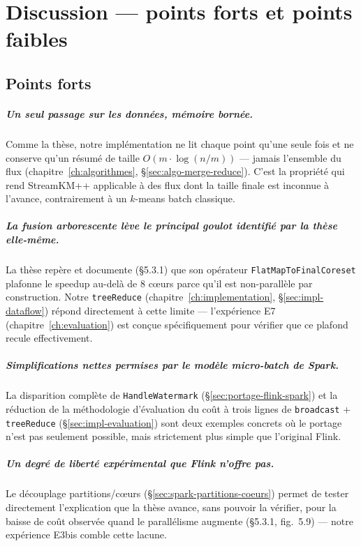 \chapter{Discussion --- points forts et points faibles}
\label{ch:discussion}

\section{Points forts}

\paragraph{Un seul passage sur les données, mémoire bornée.} Comme la thèse,
notre implémentation ne lit chaque point qu'une seule fois et ne conserve
qu'un résumé de taille $O(m \cdot \log(n/m))$ --- jamais l'ensemble du flux
(chapitre~\ref{ch:algorithmes}, §\ref{sec:algo-merge-reduce}). C'est la
propriété qui rend StreamKM++ applicable à des flux dont la taille finale
est inconnue à l'avance, contrairement à un $k$-means batch classique.

\paragraph{La fusion arborescente lève le principal goulot identifié par la
thèse elle-même.} La thèse repère et documente (§5.3.1) que son opérateur
\texttt{FlatMapToFinalCoreset} plafonne le speedup au-delà de 8 c\oe{}urs parce
qu'il est non-parallèle par construction. Notre \texttt{treeReduce}
(chapitre~\ref{ch:implementation}, §\ref{sec:impl-dataflow}) répond
directement à cette limite --- l'expérience E7
(chapitre~\ref{ch:evaluation}) est conçue spécifiquement pour vérifier que
ce plafond recule effectivement.

\paragraph{Simplifications nettes permises par le modèle micro-batch de
Spark.} La disparition complète de \texttt{HandleWatermark}
(§\ref{sec:portage-flink-spark}) et la réduction de la méthodologie
d'évaluation du coût à trois lignes de \texttt{broadcast} +
\texttt{treeReduce} (§\ref{sec:impl-evaluation}) sont deux exemples concrets
où le portage n'est pas seulement possible, mais strictement plus simple
que l'original Flink.

\paragraph{Un degré de liberté expérimental que Flink n'offre pas.} Le
découplage partitions/c\oe{}urs (§\ref{sec:spark-partitions-coeurs}) permet de
tester directement l'explication que la thèse avance, sans pouvoir la
vérifier, pour la baisse de coût observée quand le parallélisme augmente
(§5.3.1, fig.~5.9) --- notre expérience E3bis comble cette lacune.

